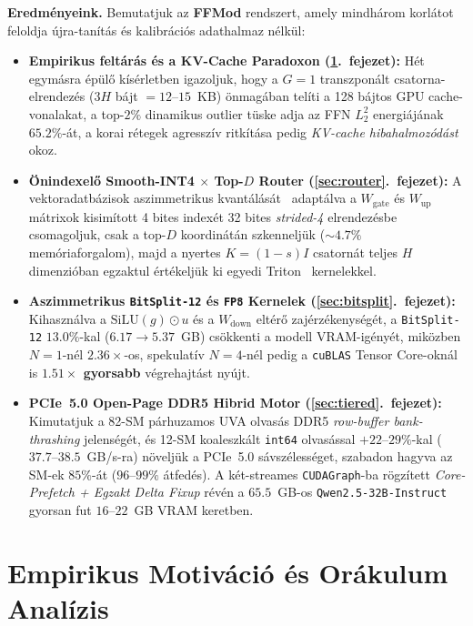 \documentclass[10pt,twocolumn]{article}
\begin{document}
\textbf{Eredményeink.} Bemutatjuk az \textbf{FFMod} rendszert, amely mindhárom korlátot feloldja újra-tanítás és kalibrációs adathalmaz nélkül:
\begin{itemize}
  \item \textbf{Empirikus feltárás és a KV-Cache Paradoxon (\ref{sec:empirical}.\ fejezet):} Hét egymásra épülő kísérletben igazoljuk, hogy a $G=1$ transzponált csatorna-elrendezés ($3H$ bájt $= 12\text{--}15$~KB) önmagában telíti a 128 bájtos GPU cache-vonalakat, a top-$2\%$ dinamikus outlier tüske adja az FFN $L_2^2$ energiájának $65.2\%$-át, a korai rétegek agresszív ritkítása pedig \emph{KV-cache hibahalmozódást} okoz.
  \item \textbf{Önindexelő Smooth-INT4 $\times$ Top-$D$ Router (\ref{sec:router}.\ fejezet):} A vektoradatbázisok aszimmetrikus kvantálását~\cite{guo2020scann,gao2024rabitq} adaptálva a $W_{\mathrm{gate}}$ és $W_{\mathrm{up}}$ mátrixok kisimított 4 bites indexét 32 bites \emph{strided-4} elrendezésbe csomagoljuk, csak a top-$D$ koordinátán szkenneljük ($\sim 4.7\%$ memóriaforgalom), majd a nyertes $K=(1-s)I$ csatornát teljes $H$ dimenzióban egzaktul értékeljük ki egyedi Triton~\cite{tillet2019triton} kernelekkel.
  \item \textbf{Aszimmetrikus \texttt{BitSplit-12} és \texttt{FP8} Kernelek (\ref{sec:bitsplit}.\ fejezet):} Kihasználva a $\mathrm{SiLU}(g)\odot u$ és a $W_{\mathrm{down}}$ eltérő zajérzékenységét, a \texttt{BitSplit-12} $13.0\%$-kal ($6.17\to 5.37$~GB) csökkenti a modell VRAM-igényét, miközben $N=1$-nél $2.36\times$-os, spekulatív $N=4$-nél pedig a \texttt{cuBLAS} Tensor Core-oknál is \textbf{$1.51\times$ gyorsabb} végrehajtást nyújt.
  \item \textbf{PCIe~5.0 Open-Page DDR5 Hibrid Motor (\ref{sec:tiered}.\ fejezet):} Kimutatjuk a 82-SM párhuzamos UVA olvasás DDR5 \emph{row-buffer bank-thrashing} jelenségét, és 12-SM koaleszkált \texttt{int64} olvasással $+22\text{--}29\%$-kal ($37.7\text{--}38.5$~GB/s-ra) növeljük a PCIe~5.0 sávszélességet, szabadon hagyva az SM-ek $85\%$-át ($96\text{--}99\%$ átfedés). A két-streames \texttt{CUDAGraph}-ba rögzített \emph{Core-Prefetch + Egzakt Delta Fixup} révén a $65.5$~GB-os \texttt{Qwen2.5-32B-Instruct} gyorsan fut $16\text{--}22$~GB VRAM keretben.
\end{itemize}

\section{Empirikus Motiváció és Orákulum Analízis}
\label{sec:empirical}
\end{document}
